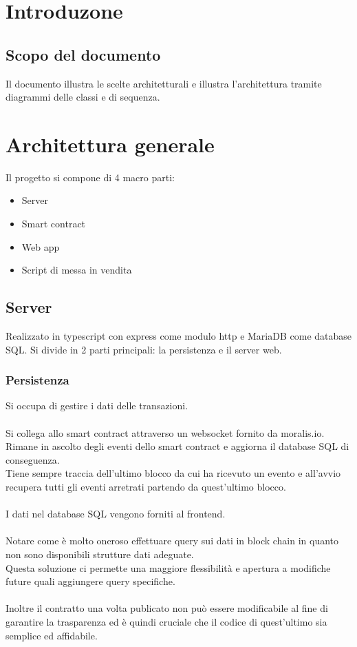 \documentclass[a4paper, 12pt]{article}
\begin{document}
\makefrontpage

\makeversioni

\section{Introduzone}
\subsection{Scopo del documento}
Il documento illustra le scelte architetturali e illustra l'architettura tramite diagrammi delle classi e di sequenza.

\section{Architettura generale}
Il progetto si compone di 4 macro parti:
\begin{itemize}
\item Server
\item Smart contract
\item Web app
\item Script di messa in vendita
\end{itemize}
\subsection{Server}
Realizzato in typescript con express come modulo http e MariaDB come database SQL.
Si divide in 2 parti principali: la persistenza e il server web.
\subsubsection{Persistenza}
Si occupa di gestire i dati delle transazioni.\\\\
Si collega allo smart contract attraverso un websocket fornito da moralis.io.\\
Rimane in ascolto degli eventi dello smart contract e 
aggiorna il database SQL di conseguenza.\\
Tiene sempre traccia dell'ultimo blocco da cui ha ricevuto un evento
e all'avvio recupera tutti gli eventi arretrati partendo da quest'ultimo blocco.\\\\
I dati nel database SQL vengono forniti al frontend.\\\\
Notare come è molto oneroso
effettuare query sui dati in block chain in quanto non sono disponibili strutture dati adeguate.\\
Questa soluzione ci permette una maggiore flessibilità e apertura a modifiche future quali aggiungere query specifiche.\\\\
Inoltre il contratto una volta publicato non può essere modificabile al fine di garantire la trasparenza ed è quindi cruciale
che il codice di quest'ultimo sia semplice ed affidabile.
\end{document}
